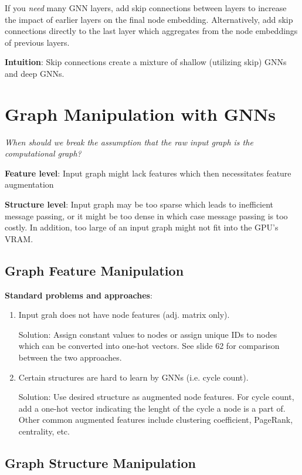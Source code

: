 \documentclass[12pt]{article}
\newcommand{\tbf}{\textbf}
\newcommand{\tit}{\textit}
\begin{document}
If you \tit{need} many GNN layers, add skip connections between layers to
increase the impact of earlier layers on the final node embedding.
Alternatively, add skip connections directly to the last layer which aggregates
from the node embeddings of previous layers.

\medskip
\tbf{Intuition}: Skip connections create a mixture of shallow (utilizing skip)
GNNs and deep GNNs.

\section*{Graph Manipulation with GNNs}

\tit{When should we break the assumption that the raw input graph is the
computational graph?}

\medskip
\tbf{Feature level}: Input graph might lack features which then necessitates
feature augmentation

\medskip
\tbf{Structure level}: Input graph may be too sparse which leads to inefficient
message passing, or it might be too dense in which case message passing is too
costly. In addition, too large of an input graph might not fit into the GPU's
VRAM.

\subsection*{Graph Feature Manipulation}

\tbf{Standard problems and approaches}:
\begin{enumerate}
  \itemsep0em
  \item Input grah does not have node features (adj. matrix only).

    Solution: Assign constant values to nodes or assign unique IDs to nodes
    which can be converted into one-hot vectors. See slide 62 for comparison
    between the two approaches.
  \item Certain structures are hard to learn by GNNs (i.e. cycle count).

    Solution: Use desired structure as augmented node features. For cycle count,
    add a one-hot vector indicating the lenght of the cycle a node is a part of.
    Other common augmented features include clustering coefficient, PageRank,
    centrality, etc.
\end{enumerate}

\subsection*{Graph Structure Manipulation}
\end{document}
